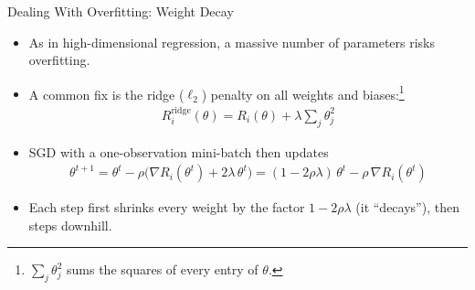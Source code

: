 \documentclass[aspectratio=169,11pt,xcolor=dvipsnames]{beamer}
\begin{document}
\begin{frame}{Dealing With Overfitting: Weight Decay}
\begin{itemize}\itemsep4pt
  \item As in high-dimensional regression, a massive number of parameters risks
        overfitting.
  \item A common fix is the ridge ($\ell_2$) penalty on all weights and
        biases:\footnote{$\sum_j\theta_j^2$ sums the squares of every entry of $\theta$.}
  \begin{align*}
    R_i^{\text{ridge}}(\theta) = R_i(\theta) + \lambda\sum_j\theta_j^2
  \end{align*}
  \item SGD with a one-observation mini-batch then updates
  \begin{align*}
    \theta^{t+1} = \theta^t - \rho\big(\nabla R_i(\theta^t) + 2\lambda\,\theta^t\big)
    = (1 - 2\rho\lambda)\,\theta^t - \rho\,\nabla R_i(\theta^t)
  \end{align*}
  \item Each step first shrinks every weight by the factor $1 - 2\rho\lambda$ (it
        ``decays''), then steps downhill.
\end{itemize}
\end{frame}
\end{document}
